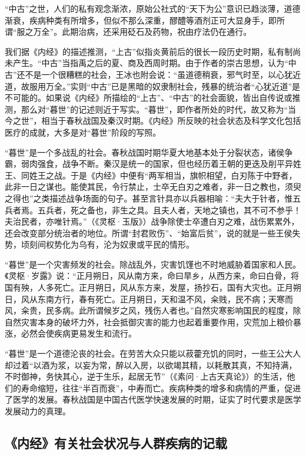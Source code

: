 \documentclass[12pt]{ctexbook}
\begin{document}
“中古”之世，人们的私有观念渐浓，原始公社式的“天下为公”意识已趋淡薄，道德渐衰，疾病种类有所增多，但似不那么深重，醪醴等酒剂正可大显身手，即所谓“服之万全”。此期治病，还采用砭石及药物，祝由疗法仍在通行。

我们据《内经》的描述推测，“上古”似指炎黄前后的很长一段历史时期，私有制尚未产生。“中古”当指禹之后的夏、商及西周时期。由于作者的崇古思想，认为“中古”还不是一个很糟糕的社会，王冰也附会说：“虽道德稍衰，邪气时至，以心犹近道，故服用万全。”实则“中古”已是黑暗的奴隶制社会，残暴的统治者“心犹近道”是不可能的。如果说《内经》所描绘的“上古”、“中古”的社会面貌，皆出自传说或推测，那么对“暮世”的记述则近于写实。“暮世”，即作者所处的时代，故又称为“当今之世”，相当于春秋战国及秦汉时期。《内经》所反映的社会状态及科学文化包括医疗的成就，大多是对“暮世”阶段的写照。

“暮世”是一个多战乱的社会。春秋战国时期华夏大地基本处于分裂状态，诸侯争霸，弱肉强食，战争不断。秦汉是统一的国家，但也经历着王朝的更迭及削平异姓王、同姓王之战。于是《内经》中便有“两军相当，旗帜相望，白刃陈于中野者，此非一日之谋也。能使其民，令行禁止，士卒无白刃之难者，非一日之教也，须臾之得也”之类描述战争场面的句子。甚至言针具亦以兵器相喻：“夫大于针者，惟五兵者焉。五兵者，死之备也，非生之具。且夫人者，天地之镇也，其不可不参乎！夫治民者，亦唯针焉。”（《灵枢·玉版》）战争除使士卒遭白刃之难，战伤累累外，还会改变部分统治者的地位。所谓“封君败伤”、“始富后贫”，说的就是一些王侯失势，顷刻间权势化为乌有，沦为奴隶或平民的情形。

“暮世”是一个灾害频发的社会。除战乱外，灾害饥馑也不时地威胁着国家和人民。《灵枢·岁露》说：“正月朔日，风从南方来，命曰旱乡，从西方来，命曰白骨，将国有殃，人多死亡。正月朔日，风从东方来，发屋，扬抄石，国有大灾也。正月朔日，风从东南方行，春有死亡。正月朔日，天和温不风，籴贱，民不病；天寒而风，籴贵，民多病。此所谓候岁之风，残伤人者也。”自然灾寒影响国民的程度，除自然灾害本身的破坏力外，社会抵御灾害的能力也起着重要作用，灾荒加上粮价暴涨，必然会使疾病更易发生和流行。

“暮世”是一个道德沦丧的社会。在劳苦大众只能以菽藿充饥的同时，一些王公大人却过着“以酒为浆，以妄为常，醉以入房，以欲竭其精，以耗散其真，不知持满，不时御神，务快其心，逆于生乐，起居无节”（《素问·上古天真论》）的生活，他们的寿命缩短，往往“半百而衰”，中寿而亡。疾病种类的增多和病情的严重，促进了医学的发展。春秋战国是中国古代医学快速发展的时期，证实了时代要求是医学发展动力的真理。

\subsection{《内经》有关社会状况与人群疾病的记载}%
\end{document}
